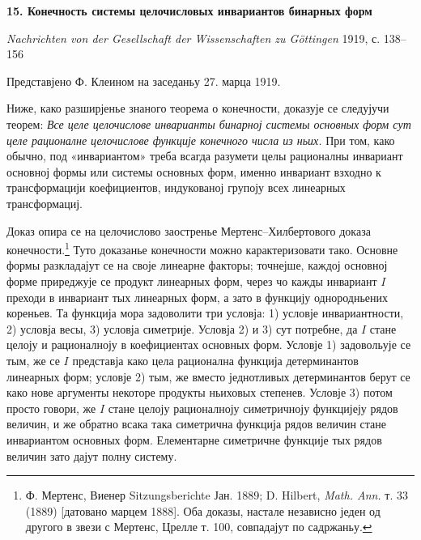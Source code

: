 ﻿\documentclass[11pt]{article}
\begin{document}

\begin{center}
{\Large\bfseries 15. Конечность системы целочисловых инвариантов бинарных форм\par}
\vspace{1em}
\emph{Nachrichten von der Gesellschaft der Wissenschaften zu Göttingen} 1919, с. 138--156
\end{center}

\vspace{2em}
\begin{center}
Представјено Ф. Клеином на заседаньу 27. марца 1919.
\end{center}

Ниже, како разширјенье знаного теорема о конечности, доказује се следујучи теорем:
{\itshape Все целе целочислове инварианты бинарној системы основных форм сут целе рационалне целочислове функције конечного числа из ньих.}
При том, како обычно, под «инвариантом» треба всагда разумети целы рационалны инвариант основној формы или системы основных форм, именно инвариант взходно к трансформацији коефициентов, индукованој групоју всех линеарных трансформациј.

Доказ опира се на целочислово заостренье Мертенс--Хилбертового доказа конечности.\footnote{Ф. Мертенс, Виенер Sitzungsberichte Јан. 1889; D. Hilbert, \emph{Math. Ann.} т. 33 (1889) [датовано марцем 1888]. Оба доказы, настале независно једен од другого в звези с Мертенс, Црелле т. 100, совпадајут по садржаньу.}
Туто доказанье конечности можно карактеризовати тако. Основне формы разкладајут се на своје линеарне факторы; точнејше, каждој основној форме приреджује се продукт линеарных форм, через чо кажды инвариант \(I\) преходи в инвариант тых линеарных форм, а зато в функцију однородньених кореньев. Та функција мора задоволити три условја: 1) условје инвариантности, 2) условја весы, 3) условја симетрије. Условја 2) и 3) сут потребне, да \(I\) стане целоју и рационалноју в коефициентах основных форм. Условје 1) задовольује се тым, же се \(I\) представја како цела рационална функција детерминантов линеарных форм; условје 2) тым, же вместо једнотливых детерминантов берут се како нове аргументы некоторе продукты ньиховых степенев. Условје 3) потом просто говори, же \(I\) стане целоју рационалноју симетричноју функцијеју рядов величин, и же обратно всака така симетрична функција рядов величин стане инвариантом основных форм. Елементарне симетричне функције тых рядов величин зато дајут полну систему.
\end{document}
